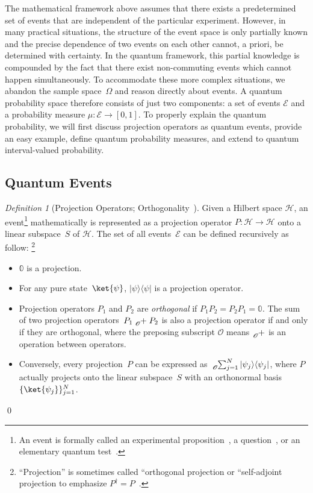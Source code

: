 \documentclass{article}
\theoremstyle{remark}
\newtheorem{definition}{Definition}
\newcommand{\events}{\ensuremath{\mathcal{E}}}
\newcommand{\qevents}{\ensuremath{\mathcal{E}}}
\newcommand{\Hilb}{\mathcal{H}}
\newcommand{\proj}[1]{|#1 \rangle\langle #1 |}
\begin{document}
The mathematical framework above assumes that there exists a predetermined
set of events that are independent of the particular experiment. However,
in many practical situations, the structure of the event space is
only partially known and the precise dependence of two events on each
other cannot, a priori, be determined with certainty. In the quantum
framework, this partial knowledge is compounded by the fact that there
exist non-commuting events which cannot happen simultaneously. To
accommodate these more complex situations, we abandon the sample space~$\Omega$
and reason directly about events. A quantum probability space therefore
consists of just two components: a set of events $\qevents$ and a
probability measure $\mu:\qevents\rightarrow[0,1]$. To properly explain
the quantum probability, we will first discuss projection operators
as quantum events, provide an easy example, define quantum probability
measures, and extend to quantum interval-valued probability.

\subsection{Quantum Events}

\begin{definition}[Projection Operators; Orthogonality~\cite{10.2307/2308516,Redhead1987-REDINA,peres1995quantum,Griffiths2003,Swart2013}]
\label{def:Projection} Given a Hilbert space $\Hilb$, an event\footnote{An event is formally called an experimental proposition~\cite{BirkhoffVonNeumann1936},
a question~\cite{10.2307/2308516,DBLP:journals/corr/abs-0910-2393},
or an elementary quantum test~\cite{peres1995quantum}.} mathematically is represented as a projection operator $P:\Hilb\rightarrow\Hilb$
onto a linear subspace~$S$ of $\Hilb$. The set of all events~$\events$
can be defined recursively as follow: \footnote{``Projection'' is sometimes called ``orthogonal projection\textquotedbl{}
or ``self-adjoint projection\textquotedbl{} to emphasize $P^{\dagger}=P$~\cite{Griffiths2003,Maassen2010}.} 
\begin{itemize}
\item $\mathbb{0}$ is a projection. 
\item For any pure state~$\ket{\psi}$, $\proj{\psi}$ is a projection
operator. 
\item Projection operators $P_{1}$ and $P_{2}$ are \emph{orthogonal} if
$P_{1}P_{2}=P_{2}P_{1}=\mathbb{0}$. The sum of two projection operators~$P_{1}\tensor*[_{\mathscr{O}}]{+}{}P_{2}$
is also a projection operator if and only if they are orthogonal,
where the preposing subscript $\mathscr{O}$ means $\tensor*[_{\mathscr{O}}]{+}{}$
is an operation between operators. 
\item Conversely, every projection~$P$ can be expressed as $\tensor*[_{\mathscr{O}}]{\sum}{_{j=1}^{N}}\proj{\psi_{j}}$,
where $P$ actually projects onto the linear subspace~$S$ with an
orthonormal basis~$\{\ket{\psi_{j}}\}_{j=1}^{N}$. 
\end{itemize}
\qed\end{definition}
\end{document}
